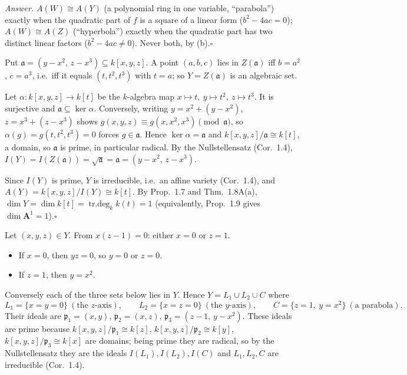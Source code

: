 \documentclass[11pt]{article}
\begin{document}
\emph{Answer.} $A(W)\cong A(Y)$ (a polynomial ring in one variable, ``parabola'') exactly when the quadratic part of $f$ is a square of a linear form ($b^2-4ac=0$); $A(W)\cong A(Z)$ (``hyperbola'') exactly when the quadratic part has two distinct linear factors ($b^2-4ac\ne0$). Never both, by (b).\hfill$\square$

\pf
Put $\mathfrak a=(y-x^2,\,z-x^3)\subseteq k[x,y,z]$. A point $(a,b,c)$ lies in $Z(\mathfrak a)$ iff $b=a^2$, $c=a^3$, i.e.\ iff it equals $(t,t^2,t^3)$ with $t=a$; so $Y=Z(\mathfrak a)$ is an algebraic set.

Let $\alpha:k[x,y,z]\to k[t]$ be the $k$-algebra map $x\mapsto t,\ y\mapsto t^2,\ z\mapsto t^3$. It is surjective and $\mathfrak a\subseteq\ker\alpha$. Conversely, writing $y=x^2+(y-x^2)$, $z=x^3+(z-x^3)$ shows $g(x,y,z)\equiv g(x,x^2,x^3)\pmod{\mathfrak a}$, so $\alpha(g)=g(t,t^2,t^3)=0$ forces $g\in\mathfrak a$. Hence $\ker\alpha=\mathfrak a$ and $k[x,y,z]/\mathfrak a\cong k[t]$, a domain, so $\mathfrak a$ is prime, in particular radical. By the Nullstellensatz (Cor.~1.4), $I(Y)=I(Z(\mathfrak a))=\sqrt{\mathfrak a}=\mathfrak a=(y-x^2,\,z-x^3)$.

Since $I(Y)$ is prime, $Y$ is irreducible, i.e.\ an affine variety (Cor.~1.4), and $A(Y)=k[x,y,z]/I(Y)\cong k[t]$. By Prop.~1.7 and Thm.~1.8A(a), $\dim Y=\dim k[t]=\operatorname{tr.deg}_k k(t)=1$ (equivalently, Prop.~1.9 gives $\dim\mathbf A^1=1$).\hfill$\square$

\pf
Let $(x,y,z)\in Y$. From $x(z-1)=0$: either $x=0$ or $z=1$.
\begin{itemize}
\item If $x=0$, then $yz=0$, so $y=0$ or $z=0$.
\item If $z=1$, then $y=x^2$.
\end{itemize}
Conversely each of the three sets below lies in $Y$. Hence $Y=L_1\cup L_2\cup C$ where
\[
L_1=\{x=y=0\}\ (\text{the $z$-axis}),\qquad L_2=\{x=z=0\}\ (\text{the $y$-axis}),\qquad C=\{z=1,\ y=x^2\}\ (\text{a parabola}).
\]
Their ideals are $\mathfrak p_1=(x,y)$, $\mathfrak p_2=(x,z)$, $\mathfrak p_3=(z-1,\,y-x^2)$. These ideals are prime because $k[x,y,z]/\mathfrak p_1\cong k[z]$, $k[x,y,z]/\mathfrak p_2\cong k[y]$, $k[x,y,z]/\mathfrak p_3\cong k[x]$ are domains; being prime they are radical, so by the Nullstellensatz they are the ideals $I(L_1),I(L_2),I(C)$ and $L_1,L_2,C$ are irreducible (Cor.~1.4).
\end{document}
